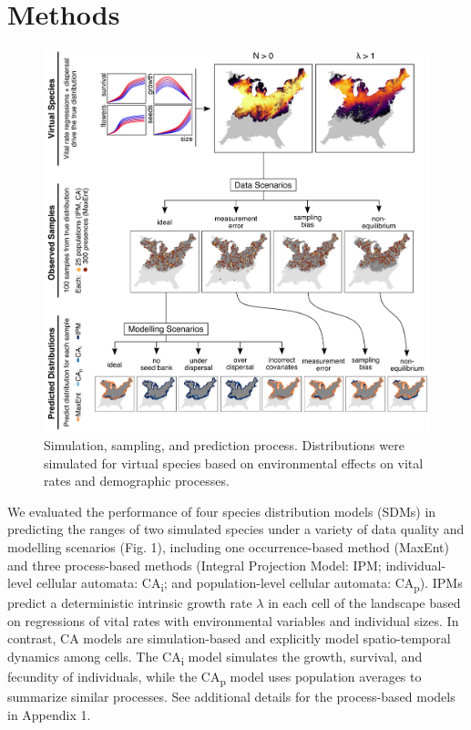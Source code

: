 \documentclass[preprint,review,times,12pt]{elsarticle}
\begin{document}
\section{Methods}

\label{S:2}
\begin{figure}
	\centering\includegraphics[width=5in]{../../figs/process_outline.png}
	\caption{\label{fig:outline} Simulation, sampling, and prediction process. Distributions were simulated for virtual species based on environmental effects on vital rates and demographic processes.}
\end{figure}
We evaluated the performance of four species distribution models (SDMs) in predicting the ranges of two simulated species under a variety of data quality and modelling scenarios (Fig. 1), including one occurrence-based method (MaxEnt) and three process-based methods (Integral Projection Model: IPM; individual-level cellular automata: CA\textsubscript{i}; and population-level cellular automata: CA\textsubscript{p}). IPMs predict a deterministic intrinsic growth rate $\lambda$ in each cell of the landscape based on regressions of vital rates with environmental variables and individual sizes. In contrast, CA models are simulation-based and explicitly model spatio-temporal dynamics among cells. The CA\textsubscript{i} model simulates the growth, survival, and fecundity of individuals, while the CA\textsubscript{p} model uses population averages to summarize similar processes. See additional details for the process-based models in Appendix 1. 
\end{document}

